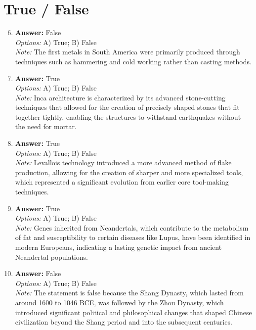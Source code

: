 \documentclass[12pt]{article}
\begin{document}
\section*{True / False}
\begin{enumerate}[label=\arabic*.]
\setcounter{enumi}{5}
\item \textbf{Answer:} False
\\ \textit{Options:} A) True; B) False
\\ \textit{Note:} The first metals in South America were primarily produced through techniques such as hammering and cold working rather than casting methods.
\item \textbf{Answer:} True
\\ \textit{Options:} A) True; B) False
\\ \textit{Note:} Inca architecture is characterized by its advanced stone-cutting techniques that allowed for the creation of precisely shaped stones that fit together tightly, enabling the structures to withstand earthquakes without the need for mortar.
\item \textbf{Answer:} True
\\ \textit{Options:} A) True; B) False
\\ \textit{Note:} Levallois technology introduced a more advanced method of flake production, allowing for the creation of sharper and more specialized tools, which represented a significant evolution from earlier core tool-making techniques.
\item \textbf{Answer:} True
\\ \textit{Options:} A) True; B) False
\\ \textit{Note:} Genes inherited from Neandertals, which contribute to the metabolism of fat and susceptibility to certain diseases like Lupus, have been identified in modern Europeans, indicating a lasting genetic impact from ancient Neandertal populations.
\item \textbf{Answer:} False
\\ \textit{Options:} A) True; B) False
\\ \textit{Note:} The statement is false because the Shang Dynasty, which lasted from around 1600 to 1046 BCE, was followed by the Zhou Dynasty, which introduced significant political and philosophical changes that shaped Chinese civilization beyond the Shang period and into the subsequent centuries.
\end{enumerate}
\end{document}
